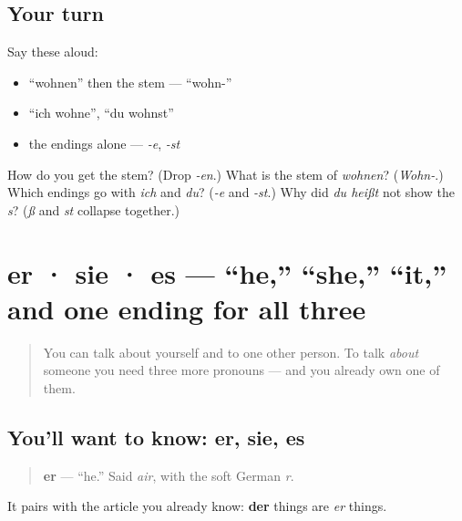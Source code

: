\subsection*{Your turn}
Say these aloud:

\begin{itemize}
\raggedright
  \item \textquotedblleft{}wohnen\textquotedblright{} then the stem — \textquotedblleft{}wohn-\textquotedblright{}
  \item \textquotedblleft{}ich wohne\textquotedblright{}, \textquotedblleft{}du wohnst\textquotedblright{}
  \item the endings alone — \emph{-e}, \emph{-st}
\end{itemize}

\begin{tcolorbox}[breakable,colback=teal!4,colframe=teal!35!black,title={Before you move on}]
How do you get the stem? (Drop \emph{-en}.) What is the stem of \emph{wohnen}? (\emph{Wohn-}.) Which endings go with \emph{ich} and \emph{du}? (\emph{-e} and \emph{-st}.) Why did \emph{du heißt} not show the \emph{s}? (\emph{ß} and \emph{st} collapse together.)
\end{tcolorbox}
\section[er · sie · es]{er · sie · es — \textquotedblleft{}he,\textquotedblright{} \textquotedblleft{}she,\textquotedblright{} \textquotedblleft{}it,\textquotedblright{} and one ending for all three}

\label{lesson:GE-C05-er-sie-es}



\begin{quote}
You can talk about yourself and to one other person. To talk \emph{about} someone you need three more pronouns — and you already own one of them.
\end{quote}

\subsection*{You'll want to know: er, sie, es}
\begin{quote}
\textbf{er} — \textquotedblleft{}he.\textquotedblright{} Said \emph{air}, with the soft German \emph{r}.
\end{quote}

It pairs with the article you already know: \textbf{der} things are \emph{er} things.

